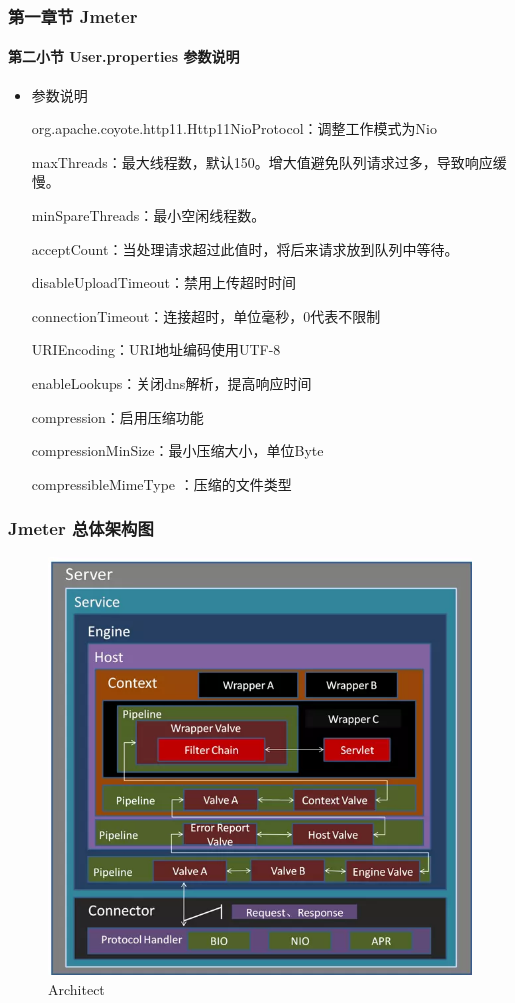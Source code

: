 \documentclass{beamer}
\begin{document}
\begin{frame}
\frametitle{第一章节 Jmeter }
\framesubtitle{第二小节 User.properties 参数说明}
\begin{itemize}
	
	\item 参数说明
	\small
	
	org.apache.coyote.http11.Http11NioProtocol：调整工作模式为Nio
	
	maxThreads：最大线程数，默认150。增大值避免队列请求过多，导致响应缓慢。
	
	minSpareThreads：最小空闲线程数。
	
	acceptCount：当处理请求超过此值时，将后来请求放到队列中等待。
	
	disableUploadTimeout：禁用上传超时时间
	
	connectionTimeout：连接超时，单位毫秒，0代表不限制
	
	URIEncoding：URI地址编码使用UTF-8
	
	enableLookups：关闭dns解析，提高响应时间
	
	compression：启用压缩功能
	
	compressionMinSize：最小压缩大小，单位Byte
	
	compressibleMimeType ：压缩的文件类型
	
\end{itemize}
\end{frame}

\begin{frame}
\frametitle{Jmeter 总体架构图}
\begin{figure}[ht]	
	\centering
	\includegraphics[scale=0.40]{img/Architect.png}
	\caption{Architect}
	\label{fig:pathdemo1}
\end{figure}

\end{frame}
\end{document}
